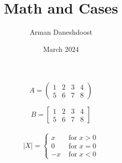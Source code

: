 \documentclass{article}
\title{Math and Cases}
\author{Arman Daneshdoost}
\date{March 2024}
\begin{document}
	\maketitle
	
	\[
	A = \begin{pmatrix} %
		1 & 2 & 3 & 4 \\
		5 & 6 & 7 & 8
	\end{pmatrix}
	\]
	
		\[
	B = \begin{bmatrix} %
		1 & 2 & 3 & 4 \\
		5 & 6 & 7 & 8
	\end{bmatrix}
	\]
	\\
	\[
	|X| = 
	\begin{cases}
		x & \text{ for } x > 0 \\
		0 & \text{ for } x = 0\\
		-x & \text{ for } x < 0
	\end{cases}
	\]
\end{document}
